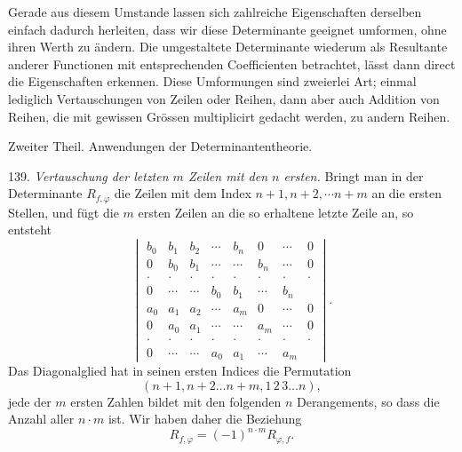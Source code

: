 Gerade aus diesem Umstande lassen sich zahlreiche Eigenschaften derselben einfach dadurch herleiten, dass wir diese Determinante geeignet umformen, ohne ihren Werth zu ändern. Die umgestaltete Determinante wiederum als Resultante anderer Functionen mit entsprechenden Coefficienten betrachtet, lässt dann direct die Eigenschaften erkennen. Diese Umformungen sind zweierlei Art; einmal lediglich Vertauschungen von Zeilen oder Reihen, dann aber auch Addition von Reihen, die mit gewissen Grössen multiplicirt gedacht werden, zu andern Reihen.



\begin{center}
Zweiter Theil. Anwendungen der Determinantentheorie.
\end{center}

139. \textit{Vertauschung der letzten $m$ Zeilen mit den $n$ ersten.} Bringt man in der Determinante $R_{f,\varphi}$ die Zeilen mit dem Index $n+1, n+2, \cdots n+m$ an die ersten Stellen, und fügt die $m$ ersten Zeilen an die so erhaltene letzte Zeile an, so entsteht
\[
\begin{vmatrix}
b_0 & b_1 & b_2 & \cdots & b_n & 0 & \cdots & 0 \\
0 & b_0 & b_1 & \cdots & \cdots & b_n & \cdots & 0 \\
\cdot & \cdot & \cdot & \cdot & \cdot & \cdot & \cdot & \cdot \\
0 & \cdots & \cdots & b_0 & b_1 & \cdots & b_n & {} \\
a_0 & a_1 & a_2 & \cdots & a_m & 0 & \cdots & 0 \\
0 & a_0 & a_1 & \cdots & \cdots & a_m & \cdots & 0 \\
\cdot & \cdot & \cdot & \cdot & \cdot & \cdot & \cdot & \cdot \\
0 & \cdots & \cdots & a_0 & a_1 & \cdots & a_m & {}
\end{vmatrix}.
\]
Das Diagonalglied hat in seinen ersten Indices die Permutation
\[
(n+1, n+2 \ldots n+m, 1\,2\,3 \ldots n),
\]
jede der $m$ ersten Zahlen bildet mit den folgenden $n$ Derangements, so dass die Anzahl aller $n\cdot m$ ist. Wir haben daher die Beziehung
\[
R_{f,\varphi} = (-1)^{n\cdot m} R_{\varphi,f}.
\]

